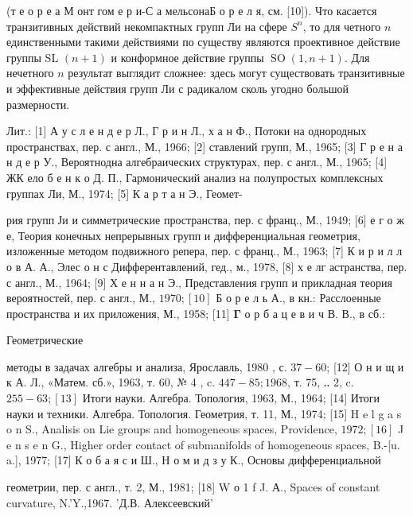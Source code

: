 \documentclass[10pt]{article}
\begin{document}
(т е о р е а М онт гом е р и-С а мельсонаБ о р е л я, см. [10]). Что касается транзитивных действий некомпактных групп Ли на сфере $S^{n}$, то для четного $n$ единственными такими действиями по существу являются проективное действие группы SL $(n+1)$ и конформное действие группы $\operatorname{SO}(1, n+1)$. Для нечетного $n$ результат выглядит сложнее: здесь могут существовать транзитивные и эффективные действия групп Ли с радикалом сколь угодно большой размерности.



Лит.: [1] А у с л е н д е р Л., Г р и н Л., х а н Ф., Потоки на однородных пространствах, пер. с англ., М., 1966; [2] ставлений групп, М., 1965; [3] Г р е н а н д е р У., Вероятнодна алгебраических структурах, пер. с англ., М., 1965; [4] ЖК ело б е н к о Д. П., Гармонический анализ на полупростых комплексных группах Ли, М., 1974; [5] К а р т а н Э., Геомет-

рия групп Ји и симметрические пространства, пер. с франц., М., 1949; [6] е г о ж е, Теория конечных непрерывных групп и дифференциальная геометрия, изложенные методом подвижного репера, пер. с франц., М., 1963; [7] К и р и л л о в А. А., Элес о н с Дифферентавлений, гед., м., 1978, [8] х е лг астранства, пер. с англ., М., 1964; [9] Х е н н а н Э., Представления групп и прикладная теория вероятностей, пер. с англ., М., $1970 ;[10]$ Б о р е л ь А., в кн.: Расслоенные пространства и их приложения, М., 1958; [11] $\boldsymbol{\Gamma}$ о р б а ц е в и ч В. В., в сб.:

Геометрические

методы в задачах алгебры и анализа, Ярославль, 1980 , с. $37-60$; [12] О н и щ и к А. Л., «Матем. сб.», 1963, т. 60, № 4 , c. $447-85 ; 1968$, т. 75, ‥ 2, c. $255-63 ;[13]$ Итоги науки. Алгебра. Топология, 1963, М., 1964; [14] Итоги науки и техники. Алгебра. Топология. Геометрия, т. 11, М., 1974; [15] H e l g a s o n S., Analisis on Lie groups and homogeneous spaces, Providence, $1972 ;[16]$ J e n s e n G., Higher order contact of submanifolds of homogeneous spaces, B.-[u. a.], 1977; [17] К о б а я с и Ш., Н о м и д з у К., Основы дифференциальной

геометрии, пер. с англ., т. 2, М., 1981; [18] W о 1 f J. А., Spaces of constant curvature, N.'Y.,1967. 'Д.В. Алексеевский'
\end{document}
